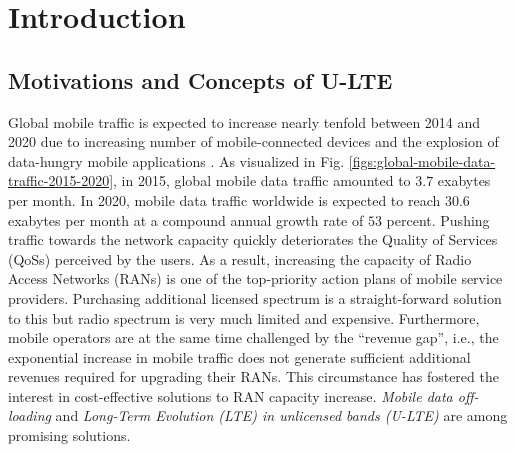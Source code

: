 %
%
%
\chapter{Introduction}
\label{intro} 




\section{Motivations and Concepts of U-LTE}
\label{lte-motiv}

Global mobile traffic is expected to increase nearly tenfold between 2014 and 2020 due to increasing number of mobile-connected devices and the explosion of data-hungry mobile applications \cite{cisco_mobile_traffic_2015}. As visualized in Fig. \ref{figs:global-mobile-data-traffic-2015-2020}, in 2015, global mobile data traffic amounted to $3.7$ exabytes per month. In 2020, mobile data traffic worldwide is expected to reach $30.6$ exabytes per month at a compound annual growth rate of $53$ percent. Pushing traffic towards the network capacity quickly deteriorates the Quality of Services (QoSs) perceived by the users. As a result, increasing the capacity of Radio Access Networks (RANs) is one of the top-priority action plans of mobile service providers. Purchasing additional licensed spectrum is a straight-forward solution to this but radio spectrum is very much limited and expensive. Furthermore, mobile operators are at the same time challenged by the ``revenue gap'', i.e., the exponential increase in mobile traffic does not generate sufficient additional revenues required for upgrading their RANs. This circumstance has fostered the interest in cost-effective solutions to RAN capacity increase. \textit{Mobile data off-loading} and \textit{Long-Term Evolution (LTE) in unlicensed bands (U-LTE)} are among promising solutions. 

